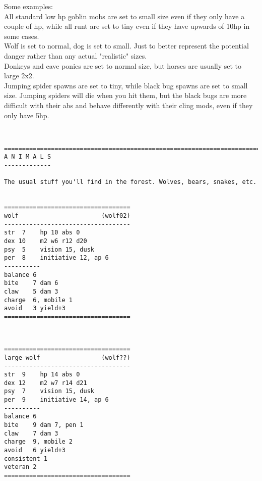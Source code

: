 Some examples:\\
All standard low hp goblin mobs are set to small size even if they only have a couple of hp, while all runt are set to tiny even if they have upwards of 10hp in some cases.\\
Wolf is set to normal, dog is set to small. Just to better represent the potential danger rather than any actual "realistic" sizes.\\
Donkeys and cave ponies are set to normal size, but horses are usually set to large 2x2.\\
Jumping spider spawns are set to tiny, while black bug spawns are set to small size. Jumping spiders will die when you hit them, but the black bugs are more difficult with their abs and behave differently with their cling mods, even if they only have 5hp.

\






\clearpage
{}


\goodbreak \begin{samepage} \small \begin{verbatim}
================================================================================
A N I M A L S
-------------

The usual stuff you'll find in the forest. Wolves, bears, snakes, etc.


===================================
wolf                       (wolf02)
-----------------------------------
str  7    hp 10 abs 0
dex 10    m2 w6 r12 d20
psy  5    vision 15, dusk
per  8    initiative 12, ap 6
----------
balance 6
bite    7 dam 6
claw    5 dam 3
charge  6, mobile 1
avoid   3 yield+3
===================================
\end{verbatim} \normalsize \end{samepage}

\

\begin{samepage} \small \begin{verbatim}
===================================
large wolf                 (wolf??)
-----------------------------------
str  9    hp 14 abs 0
dex 12    m2 w7 r14 d21
psy  7    vision 15, dusk
per  9    initiative 14, ap 6
----------
balance 6
bite    9 dam 7, pen 1
claw    7 dam 3
charge  9, mobile 2
avoid   6 yield+3
consistent 1
veteran 2
===================================
\end{verbatim} \normalsize \end{samepage}

